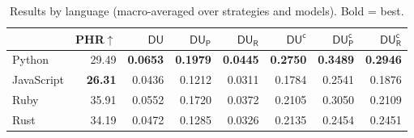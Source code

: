 \begin{table}[ht]
\centering
\small
\caption{Results by language (macro-averaged over strategies and models). Bold = best.}
\label{tab:by_language}
\begin{tabular}{lrrrrrrr}
\toprule
 & PHR$\uparrow$ & $\mathsf{DU}$ & $\mathsf{DU_P}$ & $\mathsf{DU_R}$ & $\mathsf{DU^c}$ & $\mathsf{DU^c_P}$ & $\mathsf{DU^c_R}$ \\
\midrule
  Python & 29.49 & \textbf{0.0653} & \textbf{0.1979} & \textbf{0.0445} & \textbf{0.2750} & \textbf{0.3489} & \textbf{0.2946} \\
  JavaScript & \textbf{26.31} & 0.0436 & 0.1212 & 0.0311 & 0.1784 & 0.2541 & 0.1876 \\
  Ruby & 35.91 & 0.0552 & 0.1720 & 0.0372 & 0.2105 & 0.3050 & 0.2109 \\
  Rust & 34.19 & 0.0472 & 0.1285 & 0.0326 & 0.2135 & 0.2454 & 0.2451 \\
\bottomrule
\end{tabular}
\end{table}
